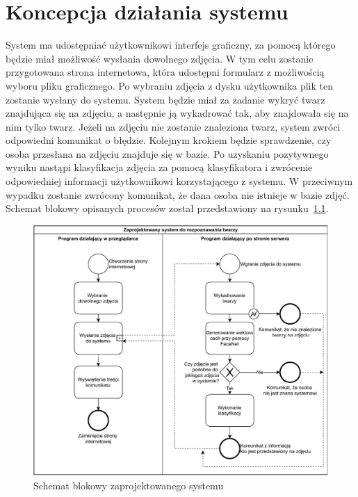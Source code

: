 \chapter{Koncepcja działania systemu}

System ma udostępniać użytkownikowi interfejs graficzny,
za pomocą którego będzie miał możliwość wysłania dowolnego zdjęcia.
W tym celu zostanie przygotowana strona internetowa,
która udostępni formularz z możliwością wyboru pliku graficznego.
Po wybraniu zdjęcia z dysku użytkownika plik ten zostanie wysłany do systemu.
System będzie miał za zadanie wykryć twarz znajdująca się na zdjęciu,
a następnie ją wykadrować tak, aby znajdowała się na nim tylko twarz.
Jeżeli na zdjęciu nie zostanie znaleziona twarz, system zwróci odpowiedni komunikat o błędzie.
Kolejnym krokiem będzie sprawdzenie, czy osoba przesłana na zdjęciu znajduje się w bazie.
Po uzyskaniu pozytywnego wyniku nastąpi klasyfikacja zdjęcia za pomocą klasyfikatora
i zwrócenie odpowiedniej informacji użytkownikowi korzystającego z systemu.
W przeciwnym wypadku zostanie zwrócony komunikat, że dana osoba nie istnieje w bazie zdjęć.
Schemat blokowy opisanych procesów został przedstawiony na rysunku~\ref{fig:schemat_blokowy_systemu}.


\begin{figure}[]
    \centering
    \includegraphics[width=1\textwidth]{images/schemat_blokowy_systemu}
    \caption{Schemat blokowy zaprojektowanego systemu}
    \customsource
    \label{fig:schemat_blokowy_systemu}
\end{figure}